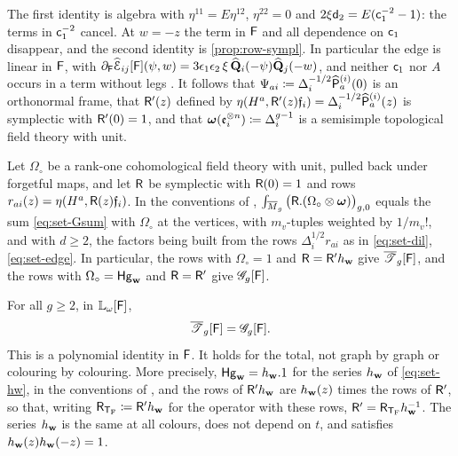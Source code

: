 The first identity is algebra with $\eta^{11}=E\eta^{12}$, $\eta^{22}=0$ and $2\xi\mathsf{d}_{2}=E(\mathsf{c}_{1}^{-2}-1)$: the terms in $\mathsf{c}_{1}^{-2}$ cancel. At $w=-z$ the term in $\mathsf{F}$ and all dependence on $\mathsf{c}_{1}$ disappear, and the second identity is \cref{prop:row-sympl}. In particular the edge is linear in $\mathsf{F}$, with $\partial_{\mathsf{F}}\widehat{\mathcal{E}}_{ij}[\mathsf{F}](\psi,w)=3\epsilon_1\epsilon_2\,\xi\,\widehat{\mathbf{Q}}_i(-\psi)\widehat{\mathbf{Q}}_j(-w)$, and neither $\mathsf{c}_{1}$ nor $A$ occurs in a term without legs . It follows that $\Psi_{ai}\coloneqq\Delta_i^{-1/2}\widehat{\mathsf{P}}_a^{(i)}(0)$ is an orthonormal frame, that $\mathsf{R}'(z)$ defined by $\eta(H^a,\mathsf{R}'(z)\mathfrak{f}_i)=\Delta_i^{-1/2}\widehat{\mathsf{P}}_a^{(i)}(z)$ is symplectic with $\mathsf{R}'(0)=1$, and that $\boldsymbol{\omega}(\mathfrak{e}_i^{\otimes n})\coloneqq\Delta_i^{g-1}$ is a semisimple topological field theory with unit.

\begin{lem}
\label{lem:fra-unfold}
Let $\Omega_{\circ}$ be a rank-one cohomological field theory with unit, pulled back under forgetful maps, and let $\mathsf{R}$ be symplectic with $\mathsf{R}(0)=1$ and rows $r_{ai}(z)=\eta(H^a,\mathsf{R}(z)\mathfrak{f}_i)$. In the conventions of \cite[Definitions~2.2, 2.5, 2.13]{PPZ15}, $\int_{\overline{M}_g}\big(\mathsf{R}.(\Omega_{\circ}\otimes\boldsymbol{\omega})\big)_{g,0}$ equals the sum \eqref{eq:set-Gsum} with $\Omega_{\circ}$ at the vertices, with $m_v$-tuples weighted by $1/m_v!$, and with $d\geq2$, the factors being built from the rows $\Delta_i^{1/2}r_{ai}$ as in \eqref{eq:set-dil}, \eqref{eq:set-edge}. In particular, the rows with $\Omega_{\circ}=1$ and $\mathsf{R}=\mathsf{R}'h_{\mathbf{w}}$ give $\overline{\mathscr{T}}_g[\mathsf{F}]$, and the rows with $\Omega_{\circ}=\mathsf{Hg}_{\mathbf{w}}$ and $\mathsf{R}=\mathsf{R}'$ give $\mathscr{G}_g[\mathsf{F}]$.
\end{lem}


\begin{thm}
\label{thm:fra-change}
For all $g\geq2$, in $\mathbb{L}_{\omega}[\mathsf{F}]$,
\[
\overline{\mathscr{T}}_g[\mathsf{F}]=\mathscr{G}_g[\mathsf{F}].
\]
This is a polynomial identity in $\mathsf{F}$. It holds for the total, not graph by graph or colouring by colouring. More precisely, $\mathsf{Hg}_{\mathbf{w}}=h_{\mathbf{w}}.1$ for the series $h_{\mathbf{w}}$ of \eqref{eq:set-hw}, in the conventions of \cite[Definition~2.13]{PPZ15}, and the rows of $\mathsf{R}'h_{\mathbf{w}}$ are $h_{\mathbf{w}}(z)$ times the rows of $\mathsf{R}'$, so that, writing $\mathsf{R}_{\mathsf{T}_{\mathrm{F}}}\coloneqq\mathsf{R}'h_{\mathbf{w}}$ for the operator with these rows, $\mathsf{R}'=\mathsf{R}_{\mathsf{T}_{\mathrm{F}}}h_{\mathbf{w}}^{-1}$. The series $h_{\mathbf{w}}$ is the same at all colours, does not depend on $t$, and satisfies $h_{\mathbf{w}}(z)h_{\mathbf{w}}(-z)=1$.
\end{thm}

